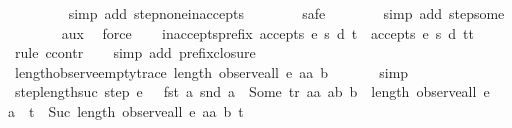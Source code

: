 \begin{isabellebody}
\ \ \ \ \ \ \ \isamarkupfalse%
\ {\isacharparenleft}simp\ add{\isacharcolon}\ step{\isacharunderscore}none{\isacharunderscore}inaccepts{\isacharparenright}\isanewline
\ \ \ \ \ \ \isamarkupfalse%
\ safe\isanewline
\ \ \ \ \ \ \isamarkupfalse%
\ {\isacharparenleft}simp\ add{\isacharcolon}\ step{\isacharunderscore}some{\isacharparenright}\isanewline
\ \ \ \ \ \ \isamarkupfalse%
\ aux{}\ \isamarkupfalse%
\ force\isanewline
\ \ \isamarkupfalse%
%
\endisatagproof
{\isafoldproof}%
%
\isadelimproof
\isanewline
%
\endisadelimproof
\isanewline
{}\isamarkupfalse%
\ inaccepts{\isacharunderscore}prefix{\isacharcolon}\ {\isachardoublequoteopen}{\isasymnot}accepts\ e\ s\ d\ t\ {\isasymLongrightarrow}\ {\isasymnot}accepts\ e\ s\ d\ {\isacharparenleft}t{\isacharat}t{\isacharprime}{\isacharparenright}{\isachardoublequoteclose}\isanewline
%
\isadelimproof
\ \ %
\endisadelimproof
%
\isatagproof
{}\isamarkupfalse%
\ {\isacharparenleft}rule\ ccontr{\isacharparenright}\isanewline
\ \ \isamarkupfalse%
\ {\isacharparenleft}simp\ add{\isacharcolon}\ prefix{\isacharunderscore}closure{\isacharparenright}%
\endisatagproof
{\isafoldproof}%
%
\isadelimproof
\isanewline
%
\endisadelimproof
\isanewline
{}\isamarkupfalse%
\ length{\isacharunderscore}observe{\isacharunderscore}empty{\isacharunderscore}trace{\isacharcolon}\ {\isachardoublequoteopen}length\ {\isacharparenleft}observe{\isacharunderscore}all\ e\ aa\ b\ {\isacharbrackleft}{\isacharbrackright}{\isacharparenright}\ {\isacharequal}\ {}{\isachardoublequoteclose}\isanewline
%
\isadelimproof
\ \ %
\endisadelimproof
%
\isatagproof
{}\isamarkupfalse%
\ simp%
\endisatagproof
{\isafoldproof}%
%
\isadelimproof
\isanewline
%
\endisadelimproof
\isanewline
{}\isamarkupfalse%
\ step{\isacharunderscore}length{\isacharunderscore}suc{\isacharcolon}\ {\isachardoublequoteopen}step\ e\ {}\ {\isacharless}{\isachargreater}\ {\isacharparenleft}fst\ a{\isacharparenright}\ {\isacharparenleft}snd\ a{\isacharparenright}\ {\isacharequal}\ Some\ {\isacharparenleft}tr{\isacharcomma}\ aa{\isacharcomma}\ ab{\isacharcomma}\ b{\isacharparenright}\ {\isasymLongrightarrow}\ length\ {\isacharparenleft}observe{\isacharunderscore}all\ e\ {}\ {\isacharless}{\isachargreater}\ {\isacharparenleft}a\ {\isacharhash}\ t{\isacharparenright}{\isacharparenright}\ {\isacharequal}\ Suc\ {\isacharparenleft}length\ {\isacharparenleft}observe{\isacharunderscore}all\ e\ aa\ b\ t{\isacharparenright}{\isacharparenright}{\isachardoublequoteclose}\isanewline

\end{isabellebody}
